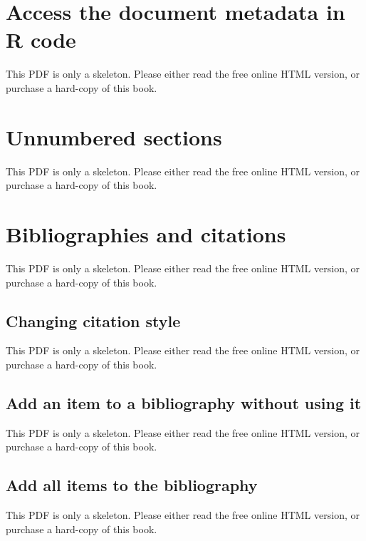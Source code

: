 \documentclass[
  11pt,
]{krantz}
\begin{document}
\section{Access the document metadata in R code}\label{document-metadata}

This PDF is only a skeleton. Please either read the free online HTML version, or purchase a hard-copy of this book.

\section{Unnumbered sections}\label{unnumbered-sections}

This PDF is only a skeleton. Please either read the free online HTML version, or purchase a hard-copy of this book.

\section{Bibliographies and citations}\label{bibliography}

This PDF is only a skeleton. Please either read the free online HTML version, or purchase a hard-copy of this book.

\subsection{Changing citation style}\label{changing-citation-style}

This PDF is only a skeleton. Please either read the free online HTML version, or purchase a hard-copy of this book.

\subsection{Add an item to a bibliography without using it}\label{add-an-item-to-a-bibliography-without-using-it}

This PDF is only a skeleton. Please either read the free online HTML version, or purchase a hard-copy of this book.

\subsection{Add all items to the bibliography}\label{add-all-items-to-the-bibliography}

This PDF is only a skeleton. Please either read the free online HTML version, or purchase a hard-copy of this book.
\end{document}
